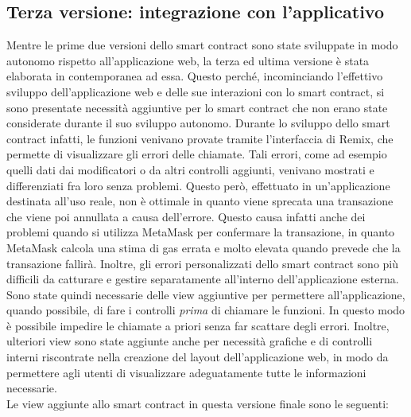 \documentclass[12pt,a4paper,openright,twoside]{report}
\begin{document}
\subsection{Terza versione: integrazione con l'applicativo}
Mentre le prime due versioni dello smart contract sono state sviluppate in modo autonomo rispetto all'applicazione web, la terza ed ultima versione è stata elaborata in contemporanea ad essa. Questo perché, incominciando l'effettivo sviluppo dell'applicazione web e delle sue interazioni con lo smart contract, si sono presentate necessità aggiuntive per lo smart contract che non erano state considerate durante il suo sviluppo autonomo. Durante lo sviluppo dello smart contract infatti, le funzioni venivano provate tramite l'interfaccia di Remix, che permette di visualizzare gli errori delle chiamate. Tali errori, come ad esempio quelli dati dai modificatori o da altri controlli aggiunti, venivano mostrati e differenziati fra loro senza problemi. Questo però, effettuato in un'applicazione destinata all'uso reale, non è ottimale in quanto viene sprecata una transazione che viene poi annullata a causa dell'errore. Questo causa infatti anche dei problemi quando si utilizza MetaMask per confermare la transazione, in quanto MetaMask calcola una stima di gas errata e molto elevata quando prevede che la transazione fallirà. Inoltre, gli errori personalizzati dello smart contract sono più difficili da catturare e gestire separatamente all'interno dell'applicazione esterna. Sono state quindi necessarie delle view aggiuntive per permettere all'applicazione, quando possibile, di fare i controlli \textit{prima} di chiamare le funzioni. In questo modo è possibile impedire le chiamate a priori senza far scattare degli errori. Inoltre, ulteriori view sono state aggiunte anche per necessità grafiche e di controlli interni riscontrate nella creazione del layout dell'applicazione web, in modo da permettere agli utenti di visualizzare adeguatamente tutte le informazioni necessarie.\\
Le view aggiunte allo smart contract in questa versione finale sono le seguenti:
\end{document}
